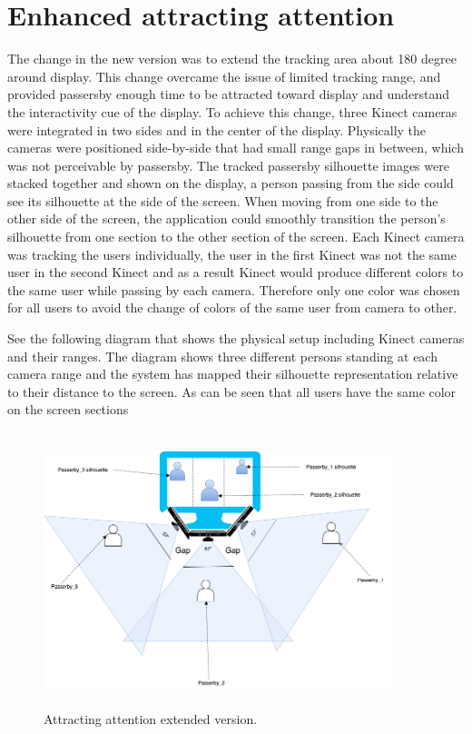 \section{Enhanced attracting attention}
The change in the new version was to extend the tracking area about 180 degree around display. This change overcame the issue of limited tracking range, and provided passersby enough time to be attracted toward display and understand the interactivity cue of the display. To achieve this change, three Kinect cameras were integrated in two sides and in the center of the display. Physically the cameras were positioned side-by-side that had small range gaps in between, which was not perceivable by passersby. The tracked passersby silhouette images were stacked together and shown on the display, a person passing from the side could see its silhouette at the side of the screen.  When moving from one side to the other side of the screen, the application could smoothly transition the person’s silhouette from one section to the other section of the screen. Each Kinect camera was tracking the users individually, the user in the first Kinect was not the same user in the second Kinect and as a result Kinect would produce different colors to the same user while passing by each camera. Therefore only one color was chosen for all users to avoid the change of colors of the same user from camera to other. 

See the following diagram that shows the physical setup including Kinect cameras and their ranges. The diagram shows three different persons standing at each camera range and the system has mapped their silhouette representation relative to their distance to the screen. As can be seen that all users have the same color on the screen sections 





\begin{figure}[H]
    \centering
    \includegraphics[width=0.9\textwidth,height=8cm]{Figures/9/Kinect_Extended}
    \caption{Attracting attention extended version.}%
    \label{fig:KinectExtended}%
\end{figure}


